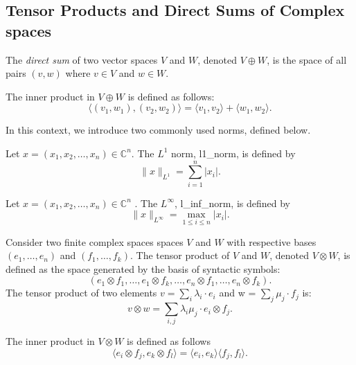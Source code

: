 \subsection {Tensor Products and Direct Sums of Complex spaces}

\begin{definition}
  The \emph{direct sum} of two vector spaces $V$ and $W$, denoted $V \oplus W$, is the space of all pairs $(v, w)$ where $v \in V$ and $w \in W$.
\end{definition}

The inner product in $V \oplus W$ is defined as follows:
\begin{equation*}
  \langle (v_1, w_1), (v_2, w_2) \rangle = \langle v_1, v_2 \rangle + \langle w_1, w_2 \rangle.
\end{equation*}


In this context, we introduce two commonly used norms, defined below.

\begin{definition}
Let \( x = (x_1, x_2, \dots, x_n) \in \mathbb{C}^n \). The \( L^1 \) norm, \gls{l1_norm},  is defined by
\[
\|x\|_{L^1} = \sum_{i=1}^n |x_i|.
\]
\end{definition}

\begin{definition}
Let \( x = (x_1, x_2, \dots, x_n) \in \mathbb{C}^n \) . The \( L^\infty \), \gls{l_inf_norm}, is defined by
\[
\|x\|_{L^\infty} = \max_{1 \leq i \leq n} |x_i|.
\]
\end{definition}


\begin{definition} \label{def:tensor_prod_fin_hilb}
Consider two finite complex spaces spaces $V$ and $W$ with respective bases $(e_1, \ldots , e_n)$ and $(f_1, \ldots , f_k)$. The tensor product of $V$ and $W$, denoted $V \otimes W$, is defined as the space generated by the basis of syntactic symbols:
\begin{equation*}
  (e_1 \otimes f_1, \ldots , e_1 \otimes f_k, \ldots , e_n \otimes f_1, \ldots , e_n \otimes f_k).
\end{equation*}
The tensor product of two elements $v = \sum_i \lambda_i \cdot e_i$ and w = $\sum_j \mu_j \cdot f_j$ is:
\begin{equation*}
  v \otimes w = \sum_{i,j} \lambda_i \mu_j \cdot e_i \otimes f_j.
\end{equation*}
\end{definition}

The inner product in $V \otimes W$ is defined as follows 
\begin{equation*}
  \langle e_i \otimes f_j, e_k \otimes f_l \rangle = \langle e_i, e_k \rangle \langle f_j, f_l \rangle.
\end{equation*}

